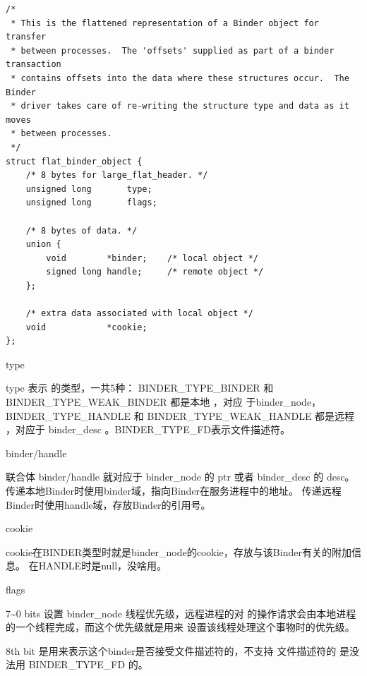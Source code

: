 \documentclass[a4paper,11pt]{article}
\begin{document}
\begin{lstlisting}[caption={flat\_binder\_object}, label=flatbinderobject]
/*
 * This is the flattened representation of a Binder object for transfer
 * between processes.  The 'offsets' supplied as part of a binder transaction
 * contains offsets into the data where these structures occur.  The Binder
 * driver takes care of re-writing the structure type and data as it moves
 * between processes.
 */
struct flat_binder_object {
	/* 8 bytes for large_flat_header. */
	unsigned long		type;
	unsigned long		flags;

	/* 8 bytes of data. */
	union {
		void		*binder;	/* local object */
		signed long	handle;		/* remote object */
	};

	/* extra data associated with local object */
	void			*cookie;
};

\end{lstlisting}

\begin{description*}
    \item [type]

        type 表示 \binder 的类型，一共5种：
         BINDER_TYPE_BINDER 和 BINDER_TYPE_WEAK_BINDER 都是本地 \binder，对应
         于binder_node，BINDER_TYPE_HANDLE 和 BINDER_TYPE_WEAK_HANDLE 都是远程
         \binder ，对应于 binder_desc 。BINDER_TYPE_FD表示文件描述符。
    \item [binder/handle]

        联合体 binder/handle 就对应于 binder_node 的 ptr 或者 binder_desc 的
        desc。传递本地Binder时使用binder域，指向Binder在服务进程中的地址。
        传递远程Binder时使用handle域，存放Binder的引用号。

    \item [cookie]

        cookie在BINDER类型时就是binder_node的cookie，存放与该Binder有关的附加信息。
        在HANDLE时是null，没啥用。

    \item [flags]

            7\~{}0 bits 设置 binder_node 线程优先级，远程进程的对 \binder
            的操作请求会由\binder 本地进程的一个线程完成，而这个优先级就是用来
            设置该线程处理这个\binder 事物时的优先级。

            8th bit 是用来表示这个binder是否接受文件描述符的，不支持
            文件描述符的 \binder 是没法用 BINDER_TYPE_FD 的。
\end{description*}
\end{document}
